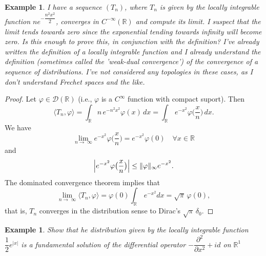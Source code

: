 \documentclass[12pt, oneside, a4paper]{article}
\theoremstyle{dfn}
\newtheorem{ex}[thm]{Example}
\newcommand{\To}{\ensuremath{\rightarrow \;}}
\renewcommand{\phi}{\varphi}
\begin{document}
\begin{ex} I have a sequence $(T_n)$, where $T_n$ is given by the locally integrable function $ne^{-\dfrac{n^{2}x^{2}}{2}}$, converges in $C^{-\infty}(\mathbb{R})$ and compute its limit. 
I suspect that the limit tends towards zero since the exponential tending towards infinity will become zero. Is this enough to prove this, in conjunction with the definition? I've already written the definition of a locally integrable function and I already understand the definition (sometimes called the 'weak-dual convergence') of the convergence of a sequence of distributions. 
   I've not considered any topologies in these cases, as I don't understand Frechet spaces and the like. 
\end{ex}
\begin{proof}
Let $\phi\in\mathcal{D}(\mathbb{R})$ (i.e., $\phi$ is a $C^\infty$ function with compact suport). Then
$$
\langle T_n,\phi\rangle=\int_\mathbb{R}n\,e^{-n^2x^2}\phi(x)\,dx=\int_\mathbb{R}\,e^{-x^2}\phi\bigl(\frac xn\bigr)\,dx.
$$
We have 
$$
\lim_{n\To\infty}e^{-x^2}\phi\bigl(\frac xn\bigr)=e^{-x^2}\phi(0)\quad\forall x\in\mathbb{R}
$$
and
$$
\Bigl|e^{-x^2}\phi\bigl(\frac xn\bigr)\Bigr|\le \|\phi\|_\infty e^{-x^2}.
$$
The dominated convergence theorem implies that
$$
\lim_{n\To\infty}\langle T_n,\phi\rangle=\phi(0)\int_\mathbb{R}\,e^{-x^2}dx=\sqrt\pi\,\phi(0),
$$
that is, $T_n$ converges in the distribution sense to Dirac's $\sqrt\pi\,\delta_0$.
\end{proof}
\begin{ex}
 Show that he distribution given by the locally integrable function $\dfrac{1}{2} e^{|x|}$ is a fundamental solution of the differential operator 
$
-\dfrac{\partial^{2}}{\partial x^{2}} + id
$ on $\mathbb{R}^{1}$
\end{ex}
\end{document}
